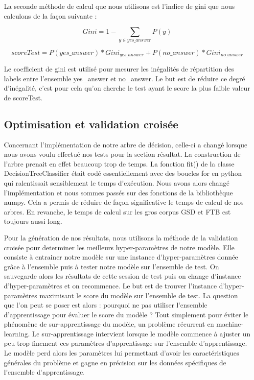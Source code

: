 \documentclass[french, 14pt]{memoir}
\begin{document}
La seconde méthode de calcul que nous utilisons est l'indice de gini que nous calculons de la façon suivante :

\begin{equation}
Gini = 1 - \sum_{y \in yes\_answer}P(y)
\end{equation}

\begin{equation}
scoreTest = P(yes\_answer) * Gini_{yes\_answer} + P(no\_answer) * Gini_{no\_answer}
\end{equation}

Le coefficient de gini est utilisé pour mesurer les inégalités de répartition des labels entre l'ensemble yes\_answer et no\_answer. Le but est de réduire ce degré d'inégalité, c'est pour cela qu'on cherche le test ayant le score la plus faible valeur de scoreTest.

\subsection{Optimisation et validation croisée}

Concernant l'implémentation de notre arbre de décision, celle-ci a changé lorsque nous avons voulu effectué nos tests pour la section résultat. La construction de l'arbre prenait en effet beaucoup trop de temps. La fonction fit() de la classe DecisionTreeClassifier était codé essentiellement avec des boucles for en python qui ralentissait sensiblement le temps d'exécution. Nous avons alors changé l'implémentation et nous sommes passés sur des fonctions de la bibliothèque numpy. Cela a permis de réduire de façon significative le temps de calcul de nos arbres. En revanche, le temps de calcul sur les gros corpus GSD et FTB est toujours aussi long. 

Pour la génération de nos résultats, nous utilisons la méthode de la validation croisée pour determiner les meilleurs hyper-paramètres de notre modèle. Elle consiste à entrainer notre modèle sur une instance d'hyper-paramètres donnée grâce à l'ensemble puis à tester notre modèle sur l'ensemble de test. On sauvegarde alors les résultats de cette session de test puis on change d'instance d'hyper-paramètres et on recommence. Le but est de trouver l'instance d'hyper-paramètres maximisant le score du modèle sur l'ensemble de test.
La question que l'on peut se poser est alors : pourquoi ne pas utiliser l'ensemble d'apprentissage pour évaluer le score du modèle ? 
Tout simplement pour éviter le phénomène de sur-apprentissage du modèle, un problème récurrent en machine-learning. Le sur-apprentissage intervient lorsque le modèle commence à ajuster un peu trop finement ces paramètres d'apprentissage sur l'ensemble d'apprentissage. Le modèle perd alors les paramètres lui permettant d'avoir les caractéristiques générales du problème et gagne en précision sur les données spécifiques de l'ensemble d'apprentissage.
\end{document}
